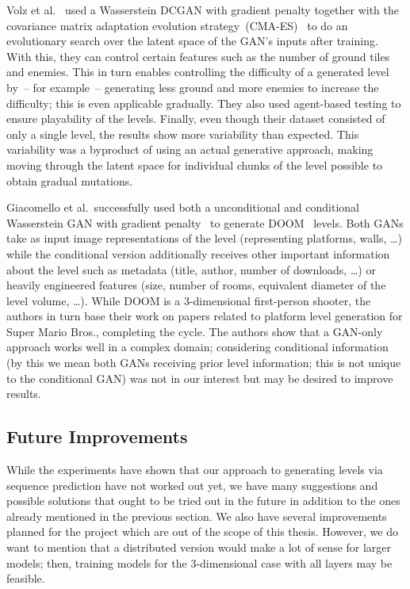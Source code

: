 Volz et
al.~\cite{volzEvolvingMarioLevels2018,thehedgeifyTheHedgeifyDagstuhlGAN2019}
used a Wasserstein DCGAN with gradient penalty together with the
covariance matrix adaptation evolution
strategy~(CMA-ES)~\cite{hansenCompletelyDerandomizedSelfAdaptation2006}
to do an evolutionary search over the latent space of the GAN's inputs
after training. With this, they can control certain features such as
the number of ground tiles and enemies. This in turn enables
controlling the difficulty of a generated level by~-- for example~--
generating less ground and more enemies to increase the difficulty;
this is even applicable gradually. They also used agent-based testing
to ensure playability of the levels. Finally, even though their
dataset consisted of only a single level, the results show more
variability than expected. This variability was a byproduct of using
an actual generative approach, making moving through the latent space
for individual chunks of the level possible to obtain gradual
mutations.

Giacomello et al.\ successfully used both a unconditional and
conditional Wasserstein GAN with gradient
penalty~\cite{gulrajaniImprovedTrainingWasserstein2017} to generate
DOOM~\cite{Doom1993Video2019} levels. Both GANs take as input image
representations of the level (representing platforms, walls, \dots)
while the conditional version additionally receives other important
information about the level such as metadata (title, author, number of
downloads, \dots) or heavily engineered features (size, number of
rooms, equivalent diameter of the level volume, \dots). While DOOM is
a 3-dimensional first-person shooter, the authors in turn base their
work on papers related to platform level generation for Super Mario
Bros., completing the cycle. The authors show that a GAN-only approach
works well in a complex domain; considering conditional information
(by this we mean both GANs receiving prior level information; this is
not unique to the conditional GAN) was not in our interest but may be
desired to improve results.

\subsection{Future Improvements}

While the experiments have shown that our approach to generating
levels via sequence prediction have not worked out yet, we have many
suggestions and possible solutions that ought to be tried out in the
future in addition to the ones already mentioned in the previous
section. We also have several improvements planned for the project
which are out of the scope of this thesis. However, we do want to
mention that a distributed version would make a lot of sense for
larger models; then, training models for the 3-dimensional case with
all layers may be feasible.

